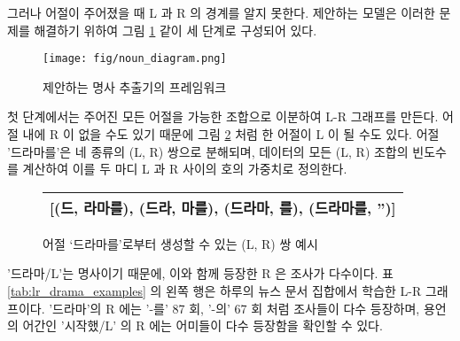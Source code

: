 \documentclass[oneside, ko,phd]{snuthesis_utf8_kor}
\begin{document}
그러나 어절이 주어졌을 때 L 과 R 의 경계를 알지 못한다.
제안하는 모델은 이러한 문제를 해결하기 위하여 그림 \ref{fig:noun_diagram} 같이 세 단계로 구성되어 있다.

\begin{figure}[ht]
\centering
\texttt{[image: fig/noun\_diagram.png]}
\caption{제안하는 명사 추출기의 프레임워크}
\label{fig:noun_diagram}
\end{figure}

첫 단계에서는 주어진 모든 어절을 가능한 조합으로 이분하여 L-R 그래프를 만든다.
어절 내에 R 이 없을 수도 있기 때문에 그림 \ref{fig:four_lrcandidates} 처럼 한 어절이 L 이 될 수도 있다.
어절 '드라마를'은 네 종류의 (L, R) 쌍으로 분해되며, 데이터의 모든 (L, R) 조합의 빈도수를 계산하여 이를 두 마디 L 과 R 사이의 호의 가중치로 정의한다.

\begin{figure}[H]
\small
\centering
\caption{어절 ‘드라마를’로부터 생성할 수 있는 (L, R) 쌍 예시}
\label{fig:four_lrcandidates}
\begin{tabular}{|c|}
\hline
{[}(드, 라마를), (드라, 마를), (드라마, 를), (드라마를, ''){]} \\ \hline
\end{tabular}%
\end{figure}

'드라마/L'는 명사이기 때문에, 이와 함께 등장한 R 은 조사가 다수이다.
표 \ref{tab:lr_drama_examples} 의 왼쪽 행은 하루의 뉴스 문서 집합에서 학습한 L-R 그래프이다.
'드라마'의 R 에는 '-를' 87 회, '-의' 67 회 처럼 조사들이 다수 등장하며, 용언의 어간인 '시작했/L' 의 R 에는 어미들이 다수 등장함을 확인할 수 있다.
\end{document}
